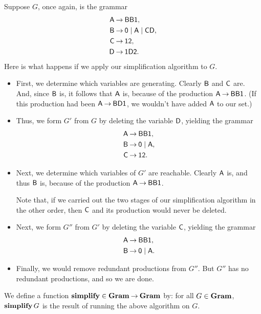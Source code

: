 Suppose $G$, once again, is the grammar
\begin{align*}
\mathsf{A} &\mathbin{\to} \mathsf{BB1}, \\
\mathsf{B} &\mathbin{\to} \mathsf{0}\mid\mathsf{A}\mid\mathsf{C}\mathsf{D}, \\
\mathsf{C} &\mathbin{\to} \mathsf{1}\mathsf{2} , \\
\mathsf{D} &\mathbin{\to} \mathsf{1}\mathsf{D}\mathsf{2} .
\end{align*}
Here is what happens if we apply our simplification algorithm to $G$.
\begin{itemize}
\item First, we determine which variables are generating. Clearly
    $\mathsf{B}$ and $\mathsf{C}$ are.  And, since $\mathsf{B}$ is, it follows that
    $\mathsf{A}$ is, because of the production $\mathsf{A}\mathbin{\to}\mathsf{BB1}$.  (If
    this production had been $\mathsf{A}\mathbin{\to}\mathsf{BD1}$, we wouldn't have
    added $\mathsf{A}$ to our set.)

\item Thus, we form $G'$ from $G$ by deleting the variable $\mathsf{D}$, yielding
  the grammar
  \begin{align*}
    \mathsf{A} &\mathbin{\to} \mathsf{BB1}, \\
    \mathsf{B} &\mathbin{\to} \mathsf{0}\mid\mathsf{A}, \\
    \mathsf{C} &\mathbin{\to} \mathsf{1}\mathsf{2} .
  \end{align*}

\item Next, we determine which variables of $G'$ are reachable.
  Clearly $\mathsf{A}$ is, and thus $\mathsf{B}$ is, because of the production
  $\mathsf{A}\mathbin{\to}\mathsf{BB1}$.

  Note that, if we carried out the two stages of our simplification
  algorithm in the other order, then $\mathsf{C}$ and its production would
  never be deleted.

\item Next, we form $G''$ from $G'$ by deleting the variable $\mathsf{C}$,
  yielding the grammar
  \begin{align*}
    \mathsf{A} &\mathbin{\to} \mathsf{BB1}, \\
    \mathsf{B} &\mathbin{\to} \mathsf{0}\mid\mathsf{A} .
  \end{align*}

\item Finally, we would remove redundant productions from $G''$.
  But $G''$ has no redundant productions, and so we are done.
\end{itemize}

%
%
%
We define a function $\mathbf{simplify}\in\mathbf{Gram}\mathbin{\to}\mathbf{Gram}$ by: for all
$G\in\mathbf{Gram}$, $\mathbf{simplify}\,G$ is the result of running the above
algorithm on $G$.

